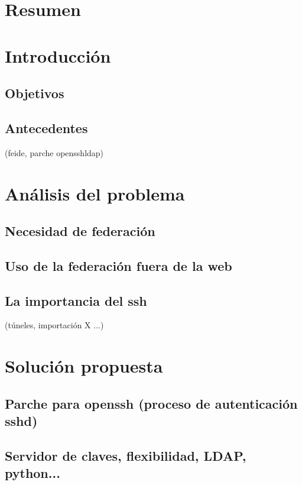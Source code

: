 
\tableofcontents

\newpage

\section{Resumen}

\newpage

\section{Introducción}
    \subsection{Objetivos}
    \subsection{Antecedentes}
        (feide, parche opensshldap)

\newpage


\section{Análisis del problema}
    \subsection{Necesidad de federación}
    \subsection{Uso de la federación fuera de la web}
    \subsection{La importancia del ssh}
         (túneles, importación X ...)

\newpage


\section{Solución propuesta}
    \subsection{Parche para openssh (proceso de autenticación sshd)}
    \subsection{Servidor de claves, flexibilidad, LDAP, python...}

